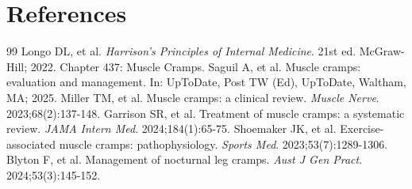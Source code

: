 \section*{References}

\begin{thebibliography}{99}
 Longo DL, et al. \emph{Harrison's Principles of Internal Medicine}. 21st ed. McGraw-Hill; 2022. Chapter 437: Muscle Cramps.
 Saguil A, et al. Muscle cramps: evaluation and management. In: UpToDate, Post TW (Ed), UpToDate, Waltham, MA; 2025.
 Miller TM, et al. Muscle cramps: a clinical review. \emph{Muscle Nerve}. 2023;68(2):137-148.
 Garrison SR, et al. Treatment of muscle cramps: a systematic review. \emph{JAMA Intern Med}. 2024;184(1):65-75.
 Shoemaker JK, et al. Exercise-associated muscle cramps: pathophysiology. \emph{Sports Med}. 2023;53(7):1289-1306.
 Blyton F, et al. Management of nocturnal leg cramps. \emph{Aust J Gen Pract}. 2024;53(3):145-152.
\end{thebibliography}
